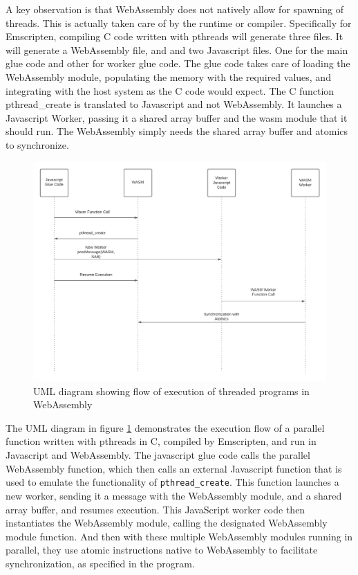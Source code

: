 \documentclass[11pt]{book}
\begin{document}
A key observation is that WebAssembly does not natively allow for spawning of threads. This is actually taken care of by the runtime or compiler. Specifically for Emscripten, compiling C code written with pthreads will generate three files. It will generate a WebAssembly file, and and two Javascript files. One for the main glue code and other for worker glue code. The glue code takes care of loading the WebAssembly module, populating the memory with the required values, and integrating with the host system as the C code would expect. The C function pthread\_create is translated to Javascript and not WebAssembly. It launches a Javascript Worker, passing it a shared array buffer and the wasm module that it should run. The WebAssembly simply needs the shared array buffer and atomics to synchronize.  

\begin{figure}[htb]
\centerline{\includegraphics[width=\textwidth]{figures/UML_threaded_wasm.png}}
\caption{UML diagram showing flow of execution of threaded programs in WebAssembly}
\label{uml}
\end{figure}


The UML diagram in figure \ref{uml} demonstrates the execution flow of a parallel function written with pthreads in C, compiled by Emscripten, and run in Javascript and WebAssembly. The javascript glue code calls the parallel WebAssembly function, which then calls an external Javascript function that is used to emulate the functionality of \texttt{pthread\_create}. This function launches a new worker, sending it a message with the WebAssembly module, and a shared array buffer, and resumes execution. This JavaScript worker code then  instantiates the WebAssembly module, calling the designated WebAssembly module function. And then with these multiple WebAssembly modules running in parallel, they use atomic instructions native to WebAssembly to facilitate synchronization, as specified in the program.
\end{document}
